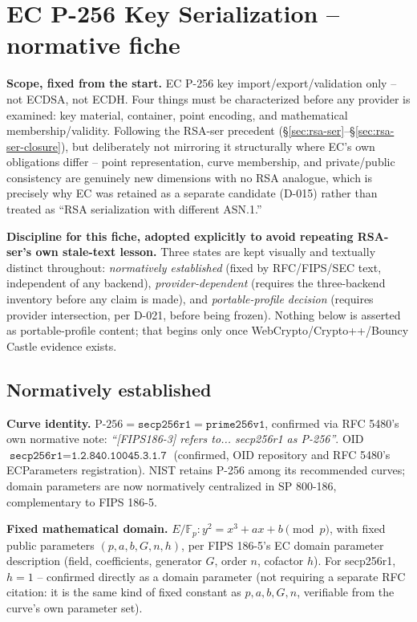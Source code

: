 \documentclass[11pt,a4paper]{article}
\begin{document}
\section{EC P-256 Key Serialization -- normative fiche}\label{sec:ec-ser}

\textbf{Scope, fixed from the start.} EC P-256 key import/export/validation only -- not ECDSA, not ECDH. Four things must be characterized before any provider is examined: key material, container, point encoding, and mathematical membership/validity. Following the RSA-ser precedent (\S\ref{sec:rsa-ser}--\S\ref{sec:rsa-ser-closure}), but deliberately not mirroring it structurally where EC's own obligations differ -- point representation, curve membership, and private/public consistency are genuinely new dimensions with no RSA analogue, which is precisely why EC was retained as a separate candidate (D-015) rather than treated as ``RSA serialization with different ASN.1.''

\textbf{Discipline for this fiche, adopted explicitly to avoid repeating RSA-ser's own stale-text lesson.} Three states are kept visually and textually distinct throughout: \emph{normatively established} (fixed by RFC/FIPS/SEC text, independent of any backend), \emph{provider-dependent} (requires the three-backend inventory before any claim is made), and \emph{portable-profile decision} (requires provider intersection, per D-021, before being frozen). Nothing below is asserted as portable-profile content; that begins only once WebCrypto/Crypto++/Bouncy Castle evidence exists.

\subsection{Normatively established}\label{sec:ec-ser-established}

\textbf{Curve identity.} $\text{P-256} = \texttt{secp256r1} = \texttt{prime256v1}$, confirmed via RFC 5480's own normative note: \emph{``[FIPS186-3] refers to... secp256r1 as P-256''}. OID $\texttt{secp256r1} = \texttt{1.2.840.10045.3.1.7}$ (confirmed, OID repository and RFC 5480's ECParameters registration). NIST retains P-256 among its recommended curves; domain parameters are now normatively centralized in SP 800-186, complementary to FIPS 186-5.

\textbf{Fixed mathematical domain.} $E/\mathbb{F}_p: y^2 = x^3+ax+b \pmod p$, with fixed public parameters $(p,a,b,G,n,h)$, per FIPS 186-5's EC domain parameter description (field, coefficients, generator $G$, order $n$, cofactor $h$). For secp256r1, $h=1$ -- confirmed directly as a domain parameter (not requiring a separate RFC citation: it is the same kind of fixed constant as $p,a,b,G,n$, verifiable from the curve's own parameter set).
\end{document}
